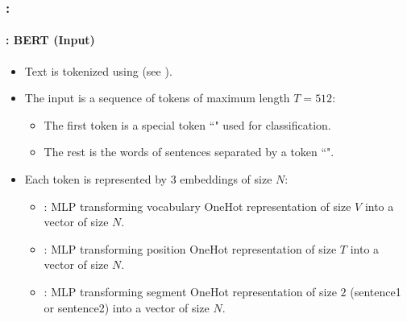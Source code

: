 \documentclass[xcolor=table]{beamer}
\begin{document}
\begin{frame}
	\frametitle{\insertshortsubtitle: \insertsection}
	\framesubtitle{\insertsubsection: BERT (Input)}

	\begin{itemize}
		\item Text is tokenized using  (see \cite{2016-wu-al}).
		\item The input is a sequence of tokens of maximum length $T = 512$:
		\begin{itemize}
			\item The first token is a special token ``\keyword{[CLS]}" used for classification.
			\item The rest is the words of sentences separated by a token ``\keyword{[SEP]}".
		\end{itemize}
		\item Each token is represented by 3 embeddings of size $N$:
		\begin{itemize}
			\item {}: MLP transforming vocabulary OneHot representation of size $V$ into a vector of size $N$.
			\item {}: MLP transforming position OneHot representation of size $T$ into a vector of size $N$.
			\item {}: MLP transforming segment OneHot representation of size $2$ (sentence1 or sentence2) into a vector of size $N$.
		\end{itemize}
	\end{itemize}
	
\end{frame}
\end{document}
